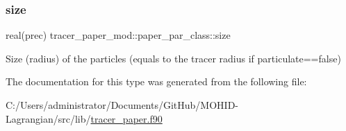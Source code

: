 \mbox{\label{structtracer__paper__mod_1_1paper__par__class_aeb0b4d046983cd2f631822e80e1600c4}} 
\subsubsection{\texorpdfstring{size}{size}}
{\footnotesize\ttfamily real(prec) tracer\+\_\+paper\+\_\+mod\+::paper\+\_\+par\+\_\+class\+::size\hspace{0.3cm}{\ttfamily [private]}}



Size (radius) of the particles (equals to the tracer radius if particulate==false) 



The documentation for this type was generated from the following file\+:\begin{DoxyCompactItemize}
\item 
C\+:/\+Users/administrator/\+Documents/\+Git\+Hub/\+M\+O\+H\+I\+D-\/\+Lagrangian/src/lib/\hyperlink{tracer__paper_8f90}{tracer\+\_\+paper.\+f90}\end{DoxyCompactItemize}
